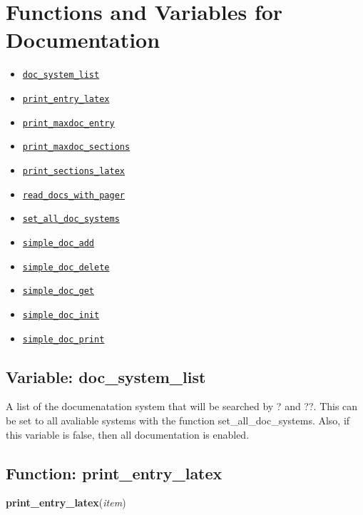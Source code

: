 \documentclass[]{article}
\begin{document}
\section{Functions and Variables for Documentation}
\begin{itemize}
\item \hyperlink{doc_system_list}{{\tt doc\_system\_list}}
\item \hyperlink{print_entry_latex}{{\tt print\_entry\_latex}}
\item \hyperlink{print_maxdoc_entry}{{\tt print\_maxdoc\_entry}}
\item \hyperlink{print_maxdoc_sections}{{\tt print\_maxdoc\_sections}}
\item \hyperlink{print_sections_latex}{{\tt print\_sections\_latex}}
\item \hyperlink{read_docs_with_pager}{{\tt read\_docs\_with\_pager}}
\item \hyperlink{set_all_doc_systems}{{\tt set\_all\_doc\_systems}}
\item \hyperlink{simple_doc_add}{{\tt simple\_doc\_add}}
\item \hyperlink{simple_doc_delete}{{\tt simple\_doc\_delete}}
\item \hyperlink{simple_doc_get}{{\tt simple\_doc\_get}}
\item \hyperlink{simple_doc_init}{{\tt simple\_doc\_init}}
\item \hyperlink{simple_doc_print}{{\tt simple\_doc\_print}}
\end{itemize}
\subsection{Variable: doc\_system\_list\label{sec:doc_system_list}}
\hypertarget{doc_system_list}{}



\vspace{5 pt}
A list of the documenatation system that will be searched by ? and ??. This can be set to all avaliable systems with the function set\_all\_doc\_systems. Also, if this variable is false, then all documentation is enabled. 

\vspace{5 pt}


\subsection{Function: print\_entry\_latex\label{sec:print_entry_latex}}
\hypertarget{print_entry_latex}{}
{\bf print\_entry\_latex}({\it item})
\end{document}
